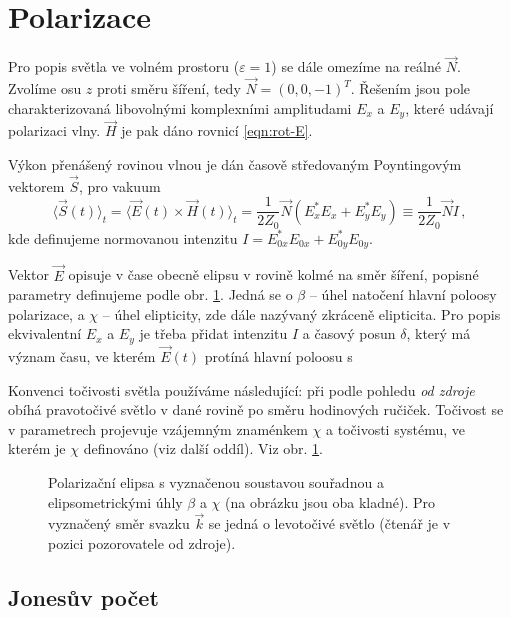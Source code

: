 \section{Polarizace}
\label{chap:polarizace}

Pro popis světla ve volném prostoru ($\varepsilon=1$) se dále omezíme na reálné $\vec{N}$.
Zvolíme osu $z$ proti směru šíření, tedy $\vec{N}=(0,0,-1)^T$.
Řešením jsou pole charakterizovaná libovolnými komplexními amplitudami $E_x$ a $E_y$, které udávají polarizaci vlny.
$\vec{H}$ je pak dáno rovnicí \eqref{eqn:rot-E}.

Výkon přenášený rovinou vlnou je dán časově středovaným Poyntingovým vektorem $\vec{S}$, pro vakuum\cite{bornPrinciplesOpticsElectromagnetic1999}
\begin{equation} \label{eqn:Poynting}
    \langle \vec{S}(t)\rangle_t=\langle\vec{E}(t)\times\vec{H}(t)\rangle_t=\frac{1}{2 Z_0}\vec{N} \left( E_x^*E_x+E_y^*E_y \right)
    \equiv \frac{1}{2 Z_0}\vec{N} I\,,
\end{equation}
kde definujeme normovanou intenzitu $I=E_{0x}^*E_{0x}+E_{0y}^*E_{0y}$.

Vektor $\vec{E}$ opisuje v čase obecně elipsu v rovině kolmé na směr šíření, popisné parametry definujeme podle obr. \ref{fig:polarizacni-elipsa}.
Jedná se o $\beta$ -- úhel natočení hlavní poloosy polarizace, a $\chi$ -- úhel elipticity, zde dále nazývaný zkráceně elipticita.
Pro popis ekvivalentní $E_x$ a $E_y$ je třeba přidat intenzitu $I$ a časový posun $\delta$, který má význam času, ve kterém $\vec{E}(t)$ protíná hlavní poloosu s

Konvenci točivosti světla používáme následující: při podle pohledu \emph{od zdroje} obíhá pravotočivé světlo v dané rovině po směru hodinových ručiček.
Točivost se v parametrech projevuje vzájemným znaménkem $\chi$ a točivosti systému, ve kterém je $\chi$ definováno (viz další oddíl).
Viz obr. \ref{fig:polarizacni-elipsa}.

\begin{figure}[htbp]
    \centering
    
    \caption{Polarizační elipsa s vyznačenou soustavou souřadnou a elipsometrickými úhly $\beta$ a $\chi$ (na obrázku jsou oba kladné).
    Pro vyznačený směr svazku $\vec{k}$ se jedná o levotočivé světlo (čtenář je v pozici pozorovatele od zdroje).}
    \label{fig:polarizacni-elipsa}
\end{figure}

\subsection{Jonesův počet}
\label{chap:Jones}

